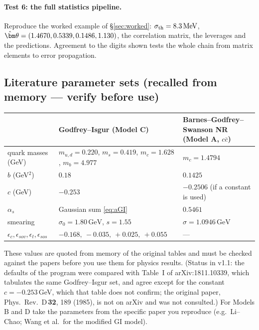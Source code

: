 \documentclass[11pt,a4paper]{article}
\numberwithin{equation}{section}
\theoremstyle{definition}
\theoremstyle{plain}
\theoremstyle{remark}
\numberwithin{algorithm}{section}
\newcommand{\as}{\alpha_s}
\newcommand{\GeV}{\,\mathrm{GeV}}
\newcommand{\MeV}{\,\mathrm{MeV}}
\newcommand{\vth}{\bm\theta}
\begin{document}
\paragraph{Test 6: the full statistics pipeline.} Reproduce the worked example of \S\ref{sec:worked}: $\sigma_{\rm th}=8.3\MeV$, $\hat\vth=(1.4670,0.5339,0.1486,1.130)$, the correlation matrix, the leverages and the predictions. Agreement to the digits shown tests the whole chain from matrix elements to error propagation.

\subsection{Literature parameter sets (recalled from memory --- verify before use)}\label{sec:params}
\begin{center}\small
\begin{tabular}{@{}p{3.1cm}p{6.2cm}p{5.2cm}@{}}
\toprule
 & Godfrey--Isgur (Model C) & Barnes--Godfrey--Swanson NR (Model A, $c\bar c$)\\\midrule
quark masses (GeV) & $m_{u,d}=0.220$, $m_s=0.419$, $m_c=1.628$, $m_b=4.977$ & $m_c=1.4794$\\
$b$ (GeV$^2$) & $0.18$ & $0.1425$\\
$c$ (GeV) & $-0.253$ & $-0.2506$ (if a constant is used)\\
$\as$ & Gaussian sum \eqref{eq:aGI} & $0.5461$\\
smearing & $\sigma_0=1.80\GeV$, $s=1.55$ & $\sigma=1.0946\GeV$\\
$\epsilon_c,\epsilon_{sov},\epsilon_t,\epsilon_{sos}$ & $-0.168,\ -0.035,\ +0.025,\ +0.055$ & ---\\\bottomrule
\end{tabular}
\end{center}
These values are quoted from memory of the original tables and must be checked against the papers before you use them for physics results. (Status in v1.1: the defaults of the program were compared with Table~I of arXiv:1811.10339, which tabulates the same Godfrey--Isgur set, and agree except for the constant $c=-0.253$\,GeV, which that table does not confirm; the original paper, Phys.\ Rev.\ D\,\textbf{32}, 189 (1985), is not on arXiv and was not consulted.) For Models B and D take the parameters from the specific paper you reproduce (e.g.\ Li--Chao; Wang et al.\ for the modified GI model).

\end{document}
